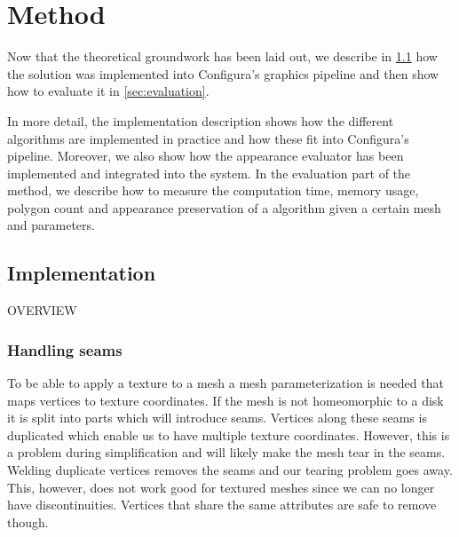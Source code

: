 
\chapter{Method} \label{cha:method}
Now that the theoretical groundwork has been laid out, we describe in \cref{sec:implementation} how the solution was implemented into Configura's graphics pipeline and then show how to evaluate it in \cref{sec:evaluation}.

\iffals
In more detail, the implementation description shows how the different algorithms are implemented in practice and how these fit into Configura's pipeline. Moreover, we also show how the appearance evaluator has been implemented and integrated into the system. In the evaluation part of the method, we describe how to measure the computation time, memory usage, polygon count and appearance preservation of a algorithm given a certain mesh and parameters.
\fi

\section{Implementation} \label{sec:implementation}
OVERVIEW

\subsection{Handling seams}
To be able to apply a texture to a mesh a mesh parameterization is needed that maps vertices to texture coordinates. If the mesh is not homeomorphic to a disk it is split into parts which will introduce seams. Vertices along these seams is duplicated which enable us to have multiple texture coordinates. However, this is a problem during simplification and will likely make the mesh tear in the seams. Welding duplicate vertices removes the seams and our tearing problem goes away. This, however, does not work good for textured meshes since we can no longer have discontinuities. Vertices that share the same attributes are safe to remove though.

